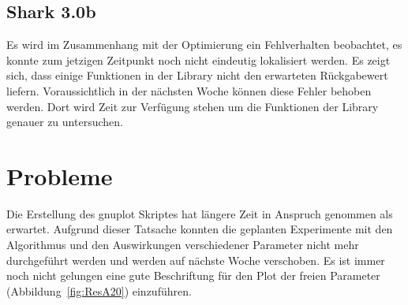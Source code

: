\documentclass[a4paper,12pt,fleqn]{article}
\begin{document}
\subsection{Shark 3.0b}
%
Es wird im Zusammenhang mit der Optimierung ein Fehlverhalten beobachtet, es konnte zum jetzigen Zeitpunkt noch nicht eindeutig lokalisiert werden. Es zeigt sich, dass einige Funktionen in der Library nicht den erwarteten Rückgabewert liefern. Voraussichtlich in der nächsten Woche können diese Fehler behoben werden. Dort wird Zeit zur Verfügung stehen um die Funktionen der Library genauer zu untersuchen.
%
\section{Probleme}
\label{Problems}
%
Die Erstellung des gnuplot Skriptes hat längere Zeit in Anspruch genommen als erwartet. Aufgrund dieser Tatsache konnten die geplanten Experimente mit den Algorithmus und den Auswirkungen verschiedener Parameter nicht mehr durchgeführt werden und werden auf nächste Woche verschoben. Es ist immer noch nicht gelungen eine gute Beschriftung für den Plot der freien Parameter (Abbildung~\ref{fig:ResA20}) einzuführen.
%


\newpage


\end{document}
